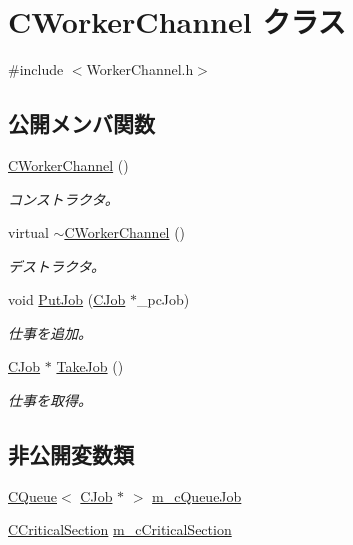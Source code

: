 \hypertarget{class_c_worker_channel}{}\section{C\+Worker\+Channel クラス}
\label{class_c_worker_channel}


{\ttfamily \#include $<$Worker\+Channel.\+h$>$}

\subsection*{公開メンバ関数}
\begin{DoxyCompactItemize}
\item 
\hyperlink{class_c_worker_channel_a245c3a5ff9cfacf84023eab2e080845d}{C\+Worker\+Channel} ()
\begin{DoxyCompactList}\small\item\em コンストラクタ。 \end{DoxyCompactList}\item 
virtual \hyperlink{class_c_worker_channel_aa01c757374b475022595875a89fa3437}{$\sim$\+C\+Worker\+Channel} ()
\begin{DoxyCompactList}\small\item\em デストラクタ。 \end{DoxyCompactList}\item 
void \hyperlink{class_c_worker_channel_aa39138e0a3146d21c1bdc77ee0987ea7}{Put\+Job} (\hyperlink{class_c_job}{C\+Job} $\ast$\+\_\+pc\+Job)
\begin{DoxyCompactList}\small\item\em 仕事を追加。 \end{DoxyCompactList}\item 
\hyperlink{class_c_job}{C\+Job} $\ast$ \hyperlink{class_c_worker_channel_a795094cd6781d1c5ea6c8fcfdb1288db}{Take\+Job} ()
\begin{DoxyCompactList}\small\item\em 仕事を取得。 \end{DoxyCompactList}\end{DoxyCompactItemize}
\subsection*{非公開変数類}
\begin{DoxyCompactItemize}
\item 
\hyperlink{_list_8h_a8a5560c80485797f14f8845ed54a9f33}{C\+Queue}$<$ \hyperlink{class_c_job}{C\+Job} $\ast$ $>$ \hyperlink{class_c_worker_channel_a7ec04e823ad886cec5cfdf291792b7f0}{m\+\_\+c\+Queue\+Job}
\item 
\hyperlink{class_c_critical_section}{C\+Critical\+Section} \hyperlink{class_c_worker_channel_a49f1da4b166a677c54c4a4566b567929}{m\+\_\+c\+Critical\+Section}
\end{DoxyCompactItemize}



